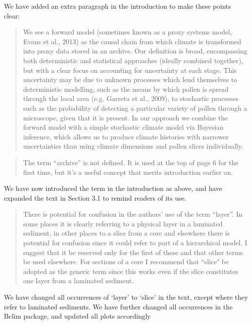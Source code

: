 \documentclass[a4paper,11pt]{article}
\begin{document}
We have added an extra paragraph in the introduction to make these points clear:
\begin{quote}
We see a forward model (sometimes known as a proxy systems model, Evans et al., 2013) as the causal chain from which climate is transformed into proxy data stored in an archive. Our definition is broad, encompassing both deterministic and statistical approaches (ideally combined together), but with a clear focus on accounting for uncertainty at each stage. This uncertainty may be due to unknown processes which lend themselves to deterministic modelling, such as the means by which pollen is spread through the local area (e.g. Garreta et al., 2009), to stochastic processes such as the probability of detecting a particular variety of pollen through a microscope, given that it is present. In our approach we combine the forward model with a simple stochastic climate model via Bayesian inference, which allows us to produce climate histories with narrower uncertainties than using climate dimensions and pollen slices individually.
\end{quote}

\begin{framed} \begin{quote}
The term ``archive'' is not defined.  It is used at the top of page 6 for the first time, but it's a useful concept that merits introduction earlier on.
\end{quote} \end{framed}
We have now introduced the term in the introduction as above, and have expanded the text in Section 3.1 to remind readers of its use.

\begin{framed} \begin{quote}
There is potential for confusion in the authors' use of the term ``layer''. In some places it is clearly referring to a physical layer in a laminated sediment, in other places to a slice from a core and elsewhere there is potential for confusion since it could refer to part of a hierarchical model.  I suggest that it be reserved only for the first of these and that other terms be used elsewhere.  For sections of a core I recommend that ``slice" be adopted as the generic term since this works even if the slice constitutes one layer from a laminated sediment.
\end{quote} \end{framed}

We have changed all occurrences of `layer' to `slice' in the text, except where they refer to laminated sediments. We have further changed all occurrences in the Bclim package, and updated all plots accordingly
\end{document}
